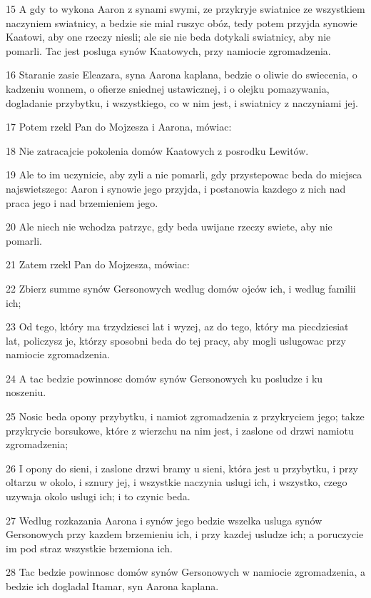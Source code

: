 \par 15 A gdy to wykona Aaron z synami swymi, ze przykryje swiatnice ze wszystkiem naczyniem swiatnicy, a bedzie sie mial ruszyc obóz, tedy potem przyjda synowie Kaatowi, aby one rzeczy niesli; ale sie nie beda dotykali swiatnicy, aby nie pomarli. Tac jest posluga synów Kaatowych, przy namiocie zgromadzenia.
\par 16 Staranie zasie Eleazara, syna Aarona kaplana, bedzie o oliwie do swiecenia, o kadzeniu wonnem, o ofierze sniednej ustawicznej, i o olejku pomazywania, dogladanie przybytku, i wszystkiego, co w nim jest, i swiatnicy z naczyniami jej.
\par 17 Potem rzekl Pan do Mojzesza i Aarona, mówiac:
\par 18 Nie zatracajcie pokolenia domów Kaatowych z posrodku Lewitów.
\par 19 Ale to im uczynicie, aby zyli a nie pomarli, gdy przystepowac beda do miejsca najswietszego: Aaron i synowie jego przyjda, i postanowia kazdego z nich nad praca jego i nad brzemieniem jego.
\par 20 Ale niech nie wchodza patrzyc, gdy beda uwijane rzeczy swiete, aby nie pomarli.
\par 21 Zatem rzekl Pan do Mojzesza, mówiac:
\par 22 Zbierz summe synów Gersonowych wedlug domów ojców ich, i wedlug familii ich;
\par 23 Od tego, który ma trzydziesci lat i wyzej, az do tego, który ma piecdziesiat lat, policzysz je, którzy sposobni beda do tej pracy, aby mogli uslugowac przy namiocie zgromadzenia.
\par 24 A tac bedzie powinnosc domów synów Gersonowych ku posludze i ku noszeniu.
\par 25 Nosic beda opony przybytku, i namiot zgromadzenia z przykryciem jego; takze przykrycie borsukowe, które z wierzchu na nim jest, i zaslone od drzwi namiotu zgromadzenia;
\par 26 I opony do sieni, i zaslone drzwi bramy u sieni, która jest u przybytku, i przy oltarzu w okolo, i sznury jej, i wszystkie naczynia uslugi ich, i wszystko, czego uzywaja okolo uslugi ich; i to czynic beda.
\par 27 Wedlug rozkazania Aarona i synów jego bedzie wszelka usluga synów Gersonowych przy kazdem brzemieniu ich, i przy kazdej usludze ich; a poruczycie im pod straz wszystkie brzemiona ich.
\par 28 Tac bedzie powinnosc domów synów Gersonowych w namiocie zgromadzenia, a bedzie ich dogladal Itamar, syn Aarona kaplana.
